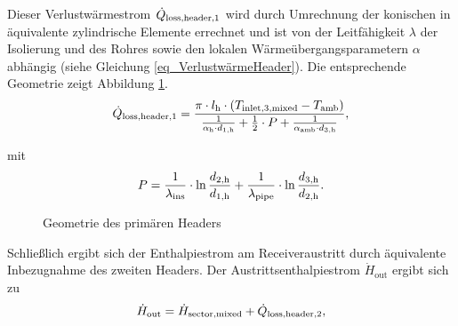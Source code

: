 Dieser Verlustwärmestrom $\dot{Q}_{\mathrm{loss,header,1}}$ wird durch Umrechnung der konischen in äquivalente zylindrische Elemente errechnet und ist von der Leitfähigkeit $\lambda$ der Isolierung und des Rohres sowie den lokalen Wärmeübergangsparametern $\alpha$ abhängig (siehe Gleichung \ref{eq_VerlustwärmeHeader}).
Die entsprechende Geometrie zeigt Abbildung \ref{fig_header}.
\begin{equation} \label{eq_VerlustwärmeHeader}
\dot{Q}_{\mathrm{loss,header,1}} = \frac{\pi \cdot l_{\mathrm{h}} \cdot\left(T_{\mathrm{inlet,3,mixed}}-T_{\text {amb}}\right)}
{\frac{1}{\alpha_{\mathrm{h}} \cdot d_{1, \mathrm{h}}}+\frac{1}{2} \cdot P+\frac{1}{\alpha_{\mathrm{amb}} \cdot d_{3, \mathrm{\mathrm{h}}}}},
\end{equation}

\vspace*{-\baselineskip}mit
\begin{equation} \label{eq_BestimmungHilfsgrößenHeader}
P=\frac{1}{\lambda_{\text {ins}}} \cdot \ln \frac{d_{2, \mathrm{h}}}{d_{1, \mathrm{h}}}+\frac{1}{\lambda_{\text {pipe}}} \cdot \ln \frac{d_{3, \mathrm{h}}}{d_{2, \mathrm{h}}}.
\end{equation}

\begin{figure}[h!]
    \centering
    \setlength{\fboxsep}{1pt}
    \setlength{\fboxrule}{1pt}
    \caption[Geometrie des primären Headers]{Geometrie des primären Headers \cite[S.97]{DissGall}}
    \label{fig_header}
\end{figure}

\pagebreak
Schließlich ergibt sich der Enthalpiestrom am Receiveraustritt durch äquivalente Inbezugnahme des zweiten Headers.
Der Austrittsenthalpiestrom $\dot{H}_{\mathrm{out}}$ ergibt sich zu
\begin{equation} \label{eq_Headerout1}
\dot{H}_{\mathrm{out}} = \dot{H}_{\mathrm{sector,mixed}} + \dot{Q}_{\mathrm{loss,header,2}},
\end{equation}

